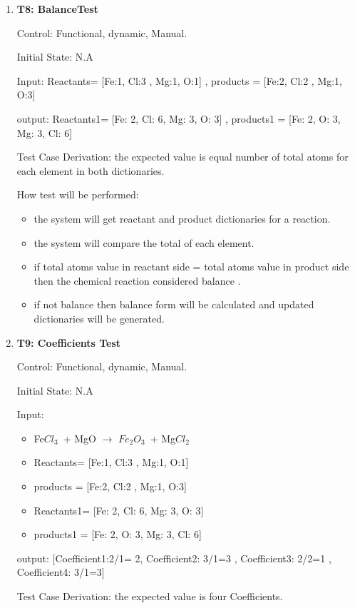 \documentclass[12pt, titlepage]{article}
\begin{document}
\begin{enumerate}
\item{\bf T8: BalanceTest\\}

Control: Functional, dynamic, Manual.
					
Initial State: N.A
					
Input: Reactants= [Fe:1, Cl:3 , Mg:1, O:1] , products = [Fe:2, Cl:2 , Mg:1, O:3]

output: Reactants1=  [Fe: 2, Cl: 6, Mg: 3, O: 3]  , products1 = [Fe: 2, O: 3, Mg: 3, Cl: 6]

Test Case Derivation: the expected value is equal number of total atoms for each element in both dictionaries.

How test will be performed: 
\begin{itemize}
\item the system will get reactant  and product dictionaries for a reaction. 
\item the system will compare the total of each element.
\item if total atoms value in reactant side = total atoms value in product side then the chemical reaction considered balance . 
\item if not balance then balance form will be calculated and updated dictionaries will be generated.
\end{itemize}

\item{\bf T9: Coefficients Test\\}

Control: Functional, dynamic, Manual.
					
Initial State: N.A
					
Input: 
\begin{itemize}
\item Fe$Cl_3$ + MgO $\rightarrow$ $Fe_2$$O_3$ + Mg$Cl_2$ 
\item Reactants= [Fe:1, Cl:3 , Mg:1, O:1] 
\item products = [Fe:2, Cl:2 , Mg:1, O:3] 
\item Reactants1=  [Fe: 2, Cl: 6, Mg: 3, O: 3] 
\item products1 = [Fe: 2, O: 3, Mg: 3, Cl: 6] 
\end{itemize}
output: [Coefficient1:2/1= 2, Coefficient2: 3/1=3 , Coefficient3: 2/2=1 , Coefficient4: 3/1=3]

Test Case Derivation: the expected value is four Coefficients.


\end{enumerate}
\end{document}
